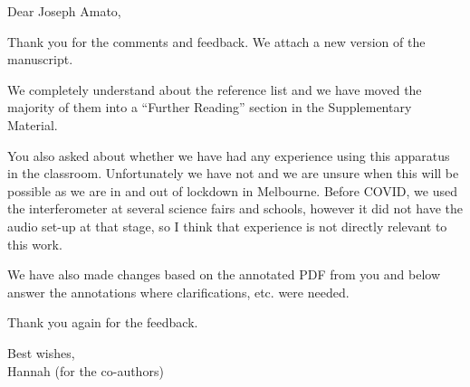 \documentclass[a4paper, 10pt]{letter}
\begin{document}
Dear Joseph Amato, 

Thank you for the comments and feedback. 
We attach a new version of the manuscript.

We completely understand about the reference list and we have moved the majority of them into a ``Further Reading'' section in the Supplementary Material. 

You also asked about whether we have had any experience using this apparatus in the classroom. Unfortunately we have not and we are unsure when this will be possible as we are in and out of lockdown in Melbourne. Before COVID, we used the interferometer at several science fairs and schools, however it did not have the audio set-up at that stage, so I think that experience is not directly relevant to this work. 

We have also made changes based on the annotated PDF from you and below answer the annotations where clarifications, etc. were needed. 

Thank you again for the feedback. 

Best wishes, \\
Hannah (for the co-authors)
 
\end{document}
